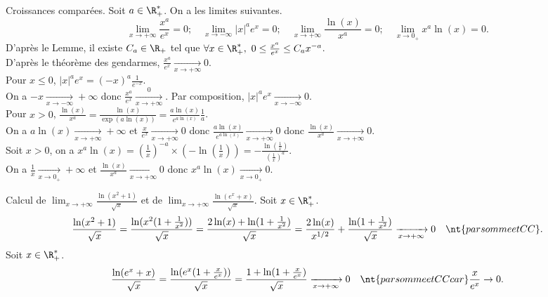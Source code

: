 \documentclass[11pt]{article}
\begin{document}
\begin{thm}{Croissances comparées.}{}
    Soit $a\in\R_+^*$. On a les limites suivantes.
    \begin{equation*}
        \lim_{x\to+\infty}\frac{x^a}{e^x}=0;\quad\lim_{x\to-\infty}|x|^ae^x=0;\quad\lim_{x\to+\infty}\frac{\ln(x)}{x^a}=0;\quad\lim_{x\to0_+}x^a\ln(x)=0.
    \end{equation*}
    \tcblower
     D'après le Lemme, il existe $C_a\in\R_+$ tel que $\forall x \in \R_+^*,~0\leq\frac{x^a}{e^x}\leq C_ax^{-a}$.\\
    D'après le théorème des gendarmes, $\frac{x^a}{e^x}\xrightarrow[x\to+\infty]{}0$.\\
     Pour $x\leq 0$, $|x|^ae^x=(-x)^a\frac{1}{e^{-x}}$.\\
    On a $-x\xrightarrow[x\to-\infty]{}+\infty$ donc $\frac{x^a}{e^x}\xrightarrow[x\to+\infty]{0}$. Par composition, $|x|^ae^x\xrightarrow[x\to-\infty]{}0$.\\
     Pour $x>0$, $\frac{\ln(x)}{x^a}=\frac{\ln(x)}{\exp(a\ln(x))}=\frac{a\ln(x)}{e^{a\ln(x)}}\frac{1}{a}$.\\
    On a $a\ln(x)\xrightarrow[x\to+\infty]{}+\infty$ et $\frac{x}{e^x}\xrightarrow[x\to+\infty]{}0$ donc $\frac{a\ln(x)}{e^{a\ln(x)}}\xrightarrow[x\to+\infty]{}0$ donc $\frac{\ln(x)}{x^a}\xrightarrow[x\to+\infty]{}0$.\\
     Soit $x>0$, on a $x^a\ln(x)=\left( \frac{1}{x} \right)^{-a}\times\left( -\ln\left( \frac{1}{x} \right) \right)=-\frac{\ln\left( \frac{1}{x} \right)}{\left( \frac{1}{x} \right)^a}$.\\
    On a $\frac{1}{x}\xrightarrow[x\to0_+]{}+\infty$ et $\frac{\ln(x)}{x^a}\xrightarrow[x\to+\infty]{}0$ donc $x^a\ln(x)\xrightarrow[x\to0_+]{}0$.
\end{thm}

\begin{ex}{}{}
    Calcul de $\lim_{x\to+\infty}\frac{\ln(x^2+1)}{\sqrt{x}}$ et de $\lim_{x\to+\infty}\frac{\ln(e^x+x)}{\sqrt{x}}$.
    \tcblower
     Soit $x\in\R_+^*$.
    \begin{equation*}
        \frac{\ln(x^2+1)}{\sqrt{x}}=\frac{\ln(x^2(1+\frac{1}{x^2}))}{\sqrt{x}}=\frac{2\ln(x)+\ln(1+\frac{1}{x^2})}{\sqrt{x}}=\frac{2\ln(x)}{x^{1/2}}+\frac{\ln(1+\frac{1}{x^2})}{\sqrt{x}}\xrightarrow[x\to+\infty]{}0\quad\nt{par somme et CC}.
    \end{equation*}
     Soit $x\in\R_+^*$.
    \begin{equation*}
        \frac{\ln(e^x+x)}{\sqrt{x}}=\frac{\ln(e^x(1+\frac{x}{e^x}))}{\sqrt{x}}=\frac{1+\ln(1+\frac{x}{e^x})}{\sqrt{x}}\xrightarrow[x\to+\infty]{}0\quad\nt{par somme et CC car }\frac{x}{e^x}\to0.
    \end{equation*}
\end{ex}
\end{document}
